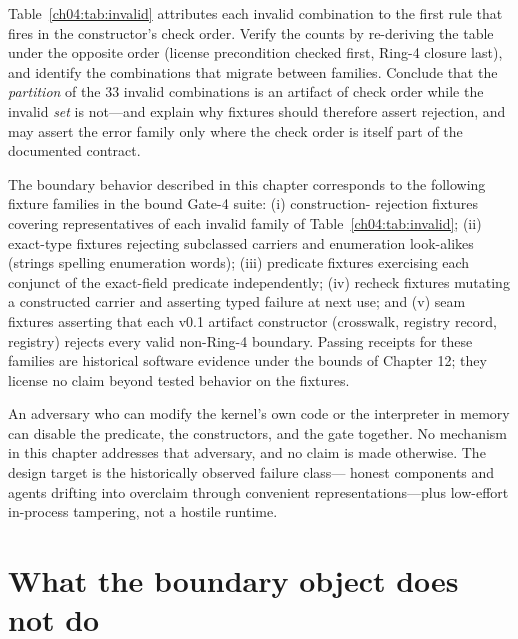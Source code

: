 \begin{exercise}\label{ch04:ex:absorption}
Table~\ref{ch04:tab:invalid} attributes each invalid combination to the
first rule that fires in the constructor's check order. Verify the
counts by re-deriving the table under the opposite order (license
precondition checked first, Ring-4 closure last), and identify the
combinations that migrate between families. Conclude that the
\emph{partition} of the 33 invalid combinations is an artifact of check
order while the invalid \emph{set} is not---and explain why fixtures
should therefore assert rejection, and may assert the error family only
where the check order is itself part of the documented contract.
\end{exercise}

\begin{checkclass}\label{ch04:check:fixtures}
The boundary behavior described in this chapter corresponds to the
following fixture families in the bound Gate-4 suite: (i) construction-
rejection fixtures covering representatives of each invalid family of
Table~\ref{ch04:tab:invalid}; (ii) exact-type fixtures rejecting
subclassed carriers and enumeration look-alikes (strings spelling
enumeration words); (iii) predicate fixtures exercising each conjunct of
the exact-field predicate independently; (iv) recheck fixtures mutating
a constructed carrier and asserting typed failure at next use; and (v)
seam fixtures asserting that each v0.1 artifact constructor (crosswalk,
registry record, registry) rejects every valid non-Ring-4 boundary.
Passing receipts for these families are historical software evidence
under the bounds of Chapter 12; they license no claim beyond tested
behavior on the fixtures.
\end{checkclass}

\begin{threat}\label{ch04:threat:residual}
An adversary who can modify the kernel's own code or the interpreter in
memory can disable the predicate, the constructors, and the gate together.
No mechanism in this chapter addresses that adversary, and no claim is made
otherwise. The design target is the historically observed failure class---
honest components and agents drifting into overclaim through convenient
representations---plus low-effort in-process tampering, not a hostile
runtime.
\end{threat}

\section{What the boundary object does not do}\label{ch04:limits}

